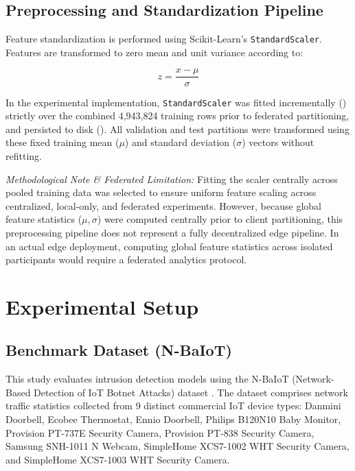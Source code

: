 \documentclass[11pt,a4paper]{article}
\begin{document}
\subsection{Preprocessing and Standardization Pipeline}
Feature standardization is performed using Scikit-Learn's \texttt{StandardScaler}. Features are transformed to zero mean and unit variance according to:

\begin{equation}
    z = \frac{x - \mu}{\sigma}
\end{equation}

In the experimental implementation, \texttt{StandardScaler} was fitted incrementally (\texttt{}) strictly over the combined 4,943,824 training rows prior to federated partitioning, and persisted to disk (\texttt{}). All validation and test partitions were transformed using these fixed training mean ($\mu$) and standard deviation ($\sigma$) vectors without refitting.

\textit{Methodological Note \& Federated Limitation:} Fitting the scaler centrally across pooled training data was selected to ensure uniform feature scaling across centralized, local-only, and federated experiments. However, because global feature statistics ($\mu, \sigma$) were computed centrally prior to client partitioning, this preprocessing pipeline does not represent a fully decentralized edge pipeline. In an actual edge deployment, computing global feature statistics across isolated participants would require a federated analytics protocol.

\section{Experimental Setup}

\subsection{Benchmark Dataset (N-BaIoT)}
This study evaluates intrusion detection models using the N-BaIoT (Network-Based Detection of IoT Botnet Attacks) dataset \cite{ref2}. The dataset comprises network traffic statistics collected from 9 distinct commercial IoT device types: Danmini Doorbell, Ecobee Thermostat, Ennio Doorbell, Philips B120N10 Baby Monitor, Provision PT-737E Security Camera, Provision PT-838 Security Camera, Samsung SNH-1011 N Webcam, SimpleHome XCS7-1002 WHT Security Camera, and SimpleHome XCS7-1003 WHT Security Camera.
\end{document}
